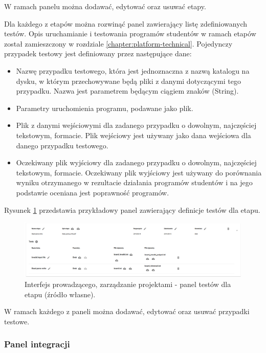 W ramach panelu można dodawać, edytować oraz usuwać etapy.


Dla każdego z etapów można rozwinąć panel zawierający listę zdefiniowanych testów.
Opis uruchamianie i testowania programów studentów w ramach etapów został zamieszczony w rozdziale \ref{chapter:platform-technical}.
Pojedynczy przypadek testowy jest definiowany przez następujące dane:
\begin {itemize}
    \item Nazwę przypadku testowego, która jest jednoznaczna z nazwą katalogu na dysku, w którym przechowywane będą pliki z danymi dotyczącymi tego przypadku.
    Nazwa jest parametrem będącym ciągiem znaków (String).
    \item Parametry uruchomienia programu, podawane jako plik.
    \item Plik z danymi wejściowymi dla zadanego przypadku o dowolnym, najczęściej tekstowym, formacie.
    Plik wejściowy jest używany jako dana wejściowa dla danego przypadku testowego.
    \item Oczekiwany plik wyjściowy dla zadanego przypadku o dowolnym, najczęściej tekstowym, formacie.
    Oczekiwany plik wyjściowy jest używany do porównania wyniku otrzymanego w rezultacie działania programów studentów i na jego podstawie oceniana jest poprawność programów.
\end {itemize}

Rysunek \ref{fig:lecturer_stages_tests} przedstawia przykładowy panel zawierający definicje testów dla etapu.

\begin{figure}[h]
    \centering
    \includegraphics[width = 15cm]{chapter04/lecturer_stages_tests.png}
    \caption{Interfejs prowadzącego, zarządzanie projektami - panel testów dla etapu (źródło własne).}
    \label{fig:lecturer_stages_tests}
\end{figure}

W ramach każdego z paneli można dodawać, edytować oraz usuwać przypadki testowe.

\subsubsection{Panel integracji}

